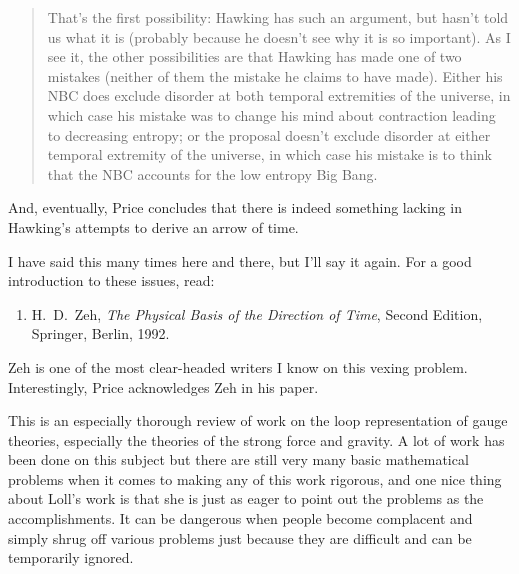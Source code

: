 \documentclass[12pt]{article}
\def\tightlist{}
\renewcommand{\texttt}[1]{%
  \begingroup
  \ttfamily
  \begingroup\lccode`~=`/\lowercase{\endgroup\def~}{/\discretionary{}{}{}}%
  \begingroup\lccode`~=`[\lowercase{\endgroup\def~}{[\discretionary{}{}{}}%
  \begingroup\lccode`~=`.\lowercase{\endgroup\def~}{.\discretionary{}{}{}}%
  \catcode`/=\active\catcode`[=\active\catcode`.=\active
  \scantokens{#1\noexpand}%
  \endgroup
}
\begin{document}
\begin{quote}
That's the first possibility: Hawking has such an argument, but hasn't
told us what it is (probably because he doesn't see why it is so
important). As I see it, the other possibilities are that Hawking has
made one of two mistakes (neither of them the mistake he claims to have
made). Either his NBC does exclude disorder at both temporal extremities
of the universe, in which case his mistake was to change his mind about
contraction leading to decreasing entropy; or the proposal doesn't
exclude disorder at either temporal extremity of the universe, in which
case his mistake is to think that the NBC accounts for the low entropy
Big Bang.
\end{quote}

And, eventually, Price concludes that there is indeed something
lacking in Hawking's attempts to derive an arrow of time.

I have said this many times here and there, but I'll say it again. For a
good introduction to these issues, read:

\begin{enumerate}
\def\labelenumi{\arabic{enumi})}
\setcounter{enumi}{1}
\tightlist
\item
 H.\ D.\ Zeh, \emph{The Physical Basis of the Direction of Time},
  Second Edition, Springer, Berlin, 1992.
\end{enumerate}
\noindent
Zeh is one of the most clear-headed writers I know on this vexing
problem. Interestingly, Price acknowledges Zeh in his paper.


This is an especially thorough review of work on the loop representation
of gauge theories, especially the theories of the strong force and
gravity. A lot of work has been done on this subject but there are still
very many basic mathematical problems when it comes to making any of
this work rigorous, and one nice thing about Loll's work is that she is
just as eager to point out the problems as the accomplishments. It can
be dangerous when people become complacent and simply shrug off various
problems just because they are difficult and can be temporarily ignored.
\end{document}

